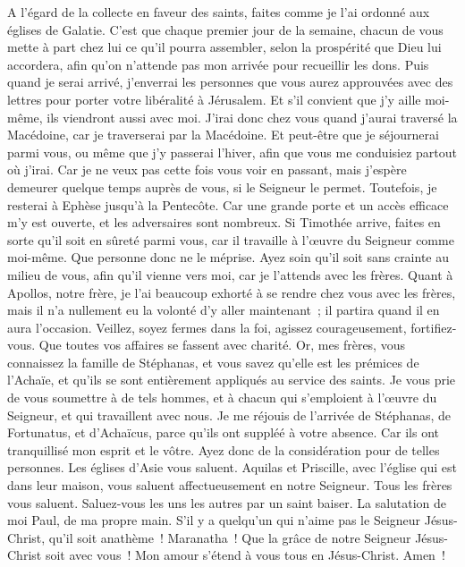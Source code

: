 \begin{multicols}{2}
\VerseOne{}A l'égard de la collecte en faveur des saints, faites comme je l'ai ordonné aux églises de Galatie.
C'est que chaque premier jour de la semaine, chacun de vous mette à part chez lui ce qu'il pourra assembler, selon la prospérité que Dieu lui accordera, afin qu'on n'attende pas mon arrivée pour recueillir les dons.
Puis quand je serai arrivé, j'enverrai les personnes que vous aurez approuvées avec des lettres pour porter votre libéralité à Jérusalem.
Et s'il convient que j'y aille moi-même, ils viendront aussi avec moi.
J'irai donc chez vous quand j'aurai traversé la Macédoine, car je traverserai par la Macédoine.
Et peut-être que je séjournerai parmi vous, ou même que j'y passerai l'hiver, afin que vous me conduisiez partout où j'irai.
Car je ne veux pas cette fois vous voir en passant, mais j'espère demeurer quelque temps auprès de vous, si le Seigneur le permet.
Toutefois, je resterai à Ephèse jusqu'à la Pentecôte.
Car une grande porte et un accès efficace m'y est ouverte, et les adversaires sont nombreux.
Si Timothée arrive, faites en sorte qu'il soit en sûreté parmi vous, car il travaille à l'œuvre du Seigneur comme moi-même.
Que personne donc ne le méprise. Ayez soin qu'il soit sans crainte au milieu de vous, afin qu'il vienne vers moi, car je l'attends avec les frères.
Quant à Apollos, notre frère, je l'ai beaucoup exhorté à se rendre chez vous avec les frères, mais il n'a nullement eu la volonté d'y aller maintenant~; il partira quand il en aura l'occasion.
Veillez, soyez fermes dans la foi, agissez courageusement, fortifiez-vous.
Que toutes vos affaires se fassent avec charité.
Or, mes frères, vous connaissez la famille de Stéphanas, et vous savez qu'elle est les prémices de l'Achaïe, et qu'ils se sont entièrement appliqués au service des saints.
Je vous prie de vous soumettre à de tels hommes, et à chacun qui s'emploient à l'œuvre du Seigneur, et qui travaillent avec nous.
Je me réjouis de l'arrivée de Stéphanas, de Fortunatus, et d'Achaïcus, parce qu'ils ont suppléé à votre absence.
Car ils ont tranquillisé mon esprit et le vôtre. Ayez donc de la considération pour de telles personnes.
Les églises d'Asie vous saluent. Aquilas et Priscille, avec l'église qui est dans leur maison, vous saluent affectueusement en notre Seigneur.
Tous les frères vous saluent. Saluez-vous les uns les autres par un saint baiser.
La salutation de moi Paul, de ma propre main.
S'il y a quelqu'un qui n'aime pas le Seigneur Jésus-Christ, qu'il soit anathème~! Maranatha~!
Que la grâce de notre Seigneur Jésus-Christ soit avec vous~!
Mon amour s'étend à vous tous en Jésus-Christ. Amen~!
\PPE{}
\end{multicols}
